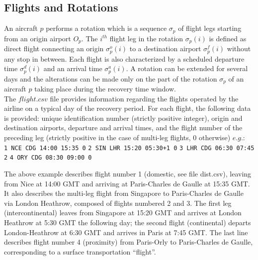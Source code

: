 \documentclass[ijoo,nonblindrev]{informs-ijoo}
\begin{document}
\subsection{Flights and Rotations} \label{subsec:flightsRotations}

An aircraft $p$ performs a rotation which is a sequence $ \sigma_p$ of flight legs starting from an origin airport $O_p$. The $i^{th}$ flight leg in the rotation $ \sigma_p(i)$ is defined as direct flight connecting an origin $ \sigma^o_p(i)$  to a destination airport $ \sigma^f_p(i)$  without any stop in between. Each flight is also characterized by a scheduled departure time $ \sigma^d_p(i)$  and an arrival time $ \sigma^a_p(i)$. A rotation can be extended for several days and the alterations can be made only on the part of the rotation $ \sigma_p$ of an aircraft $p$ taking place during the recovery time window.\\

The $flight.csv$ file provides information regarding the flights operated by the airline on a typical day of the recovery period. For each flight, the following data is provided: unique identification number (strictly positive integer), origin and destination airports, departure and arrival times, and the flight number of the preceding leg (strictly positive in the case of multi-leg flights, 0 otherwise) $e.g.$:\\
\newline
{\texttt{\footnotesize 1 NCE CDG 14:00 15:35 0}}
\newline
{\texttt{\footnotesize 2 SIN LHR 15:20 05:30+1 0}}
\newline
{\texttt{\footnotesize 3 LHR CDG 06:30 07:45 2}}
\newline
{\texttt{\footnotesize 4 ORY CDG 08:30 09:00 0}}
\newline

The above example describes flight number 1 (domestic, see file dist.csv), leaving from Nice at 14:00 GMT and arriving at Paris-Charles de Gaulle at 15:35 GMT. It also describes the multi-leg flight from Singapore to Paris-Charles de Gaulle via London Heathrow, composed of flights numbered 2 and 3. The first leg (intercontinental) leaves from Singapore at 15:20 GMT and arrives at London Heathrow at 5:30 GMT the following day; the second flight (continental) departs London-Heathrow at 6:30 GMT and arrives in Paris at 7:45 GMT. The last line describes flight number 4 (proximity) from Paris-Orly to Paris-Charles de Gaulle, corresponding to a surface transportation “flight”.
\end{document}
